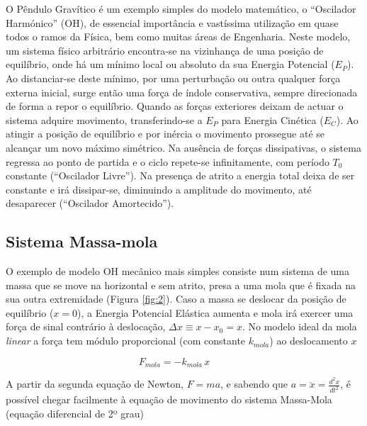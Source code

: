 \documentclass[a4paper,twoside,12pt]{article}      %
\begin{document}
O Pêndulo Gravítico é um exemplo simples do modelo  matemático, o ``Oscilador Harmónico'' (OH), 
de essencial importância e  vastíssima utilização em quase todos o ramos da Física,
 bem como muitas áreas de Engenharia. 
 Neste modelo, um sistema físico arbitrário encontra-se na vizinhança de uma posição 
 de equilíbrio, onde há um mínimo local ou absoluto da sua Energia Potencial  ($E_P$). 
Ao distanciar-se deste mínimo, por uma perturbação ou outra qualquer força externa inicial, 
surge então uma força de índole conservativa, sempre direcionada de forma a repor o equilíbrio. 
Quando as forças exteriores deixam de actuar o sistema adquire movimento, 
transferindo-se a $E_P$ para Energia Cinética ($E_C$). 
Ao atingir a posição de equilíbrio e por inércia o movimento prossegue até se alcançar um 
novo máximo simétrico. 
Na ausência de forças dissipativas, o sistema regressa  ao ponto de partida e o ciclo repete-se infinitamente, com período $T_0$ constante (``Oscilador Livre''). Na presença de atrito a energia total deixa de ser constante e irá dissipar-se, diminuindo a amplitude do movimento, até desaparecer (``Oscilador Amortecido'').

\subsection{\sf Sistema Massa-mola}
O exemplo de modelo OH mecânico mais simples  consiste num sistema de uma massa que se 
move na horizontal e sem atrito,  presa a uma mola  que é fixada na sua outra extremidade (Figura \ref{fig:2}). 
Caso a massa se deslocar da posição de equilíbrio ($x =0$), a Energia Potencial Elástica aumenta e mola irá exercer uma força de sinal contrário à deslocação, $\Delta x \equiv x - x_0 = x$.
 No modelo ideal da mola \emph{linear}  a força tem  módulo proporcional (com constante $k_{mola}$) ao deslocamento $x$ 

\begin{equation}
F_{mola} = - k_{mola} \, x \qquad 
\end{equation}

A partir da segunda equação de Newton, $F=m a$, e sabendo que $ a = \ddot{x}= \frac{d^2 x}{dt^2}$, é possível chegar facilmente  à equação de movimento do sistema Massa-Mola (equação diferencial de 2º grau)
\end{document}

